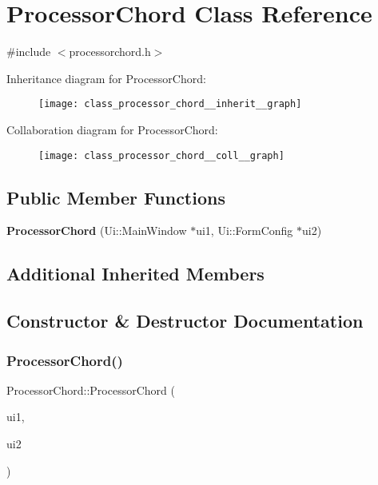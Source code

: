 \section{Processor\+Chord Class Reference}
\label{class_processor_chord}


{\ttfamily \#include $<$processorchord.\+h$>$}



Inheritance diagram for Processor\+Chord\+:\nopagebreak
\begin{figure}[H]
\begin{center}
\leavevmode
\texttt{[image: class\_processor\_chord\_\_inherit\_\_graph]}
\end{center}
\end{figure}


Collaboration diagram for Processor\+Chord\+:\nopagebreak
\begin{figure}[H]
\begin{center}
\leavevmode
\texttt{[image: class\_processor\_chord\_\_coll\_\_graph]}
\end{center}
\end{figure}
\subsection*{Public Member Functions}
\begin{DoxyCompactItemize}
\item 
\textbf{ Processor\+Chord} (Ui\+::\+Main\+Window $\ast$ui1, Ui\+::\+Form\+Config $\ast$ui2)
\end{DoxyCompactItemize}
\subsection*{Additional Inherited Members}


\subsection{Constructor \& Destructor Documentation}
\mbox{\label{class_processor_chord_a613315d2ab2ae077c53090f2104c5887}} 
\subsubsection{Processor\+Chord()}
{\footnotesize\ttfamily Processor\+Chord\+::\+Processor\+Chord (\begin{DoxyParamCaption}\item[{Ui\+::\+Main\+Window $\ast$}]{ui1,  }\item[{Ui\+::\+Form\+Config $\ast$}]{ui2 }\end{DoxyParamCaption})}

